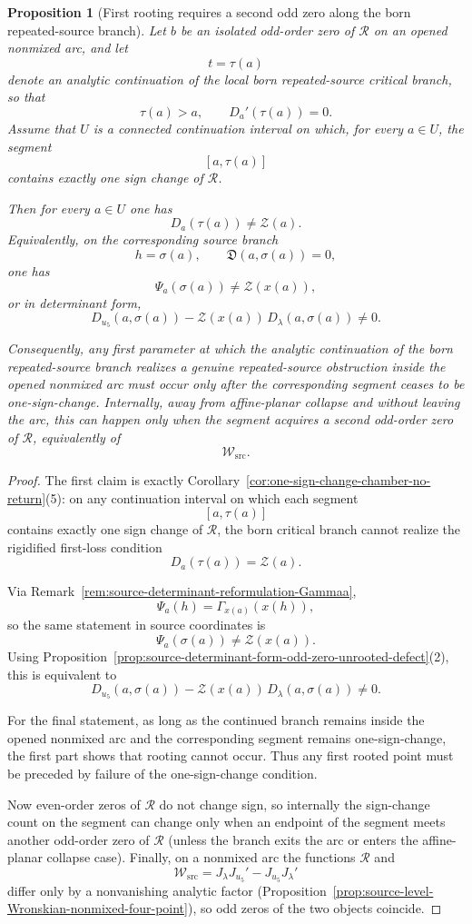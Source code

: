 \documentclass[11pt,a4paper]{amsart}
\theoremstyle{plain}
\newtheorem{proposition}[theorem]{Proposition}
\theoremstyle{definition}
\begin{document}
\begin{proposition}[First rooting requires a second odd zero along the born repeated-source branch]
\label{prop:first-rooting-requires-second-odd-zero-repeated-source}
Let $b$ be an isolated odd-order zero of $\mathcal R$ on an opened nonmixed
arc, and let
\[
t=\tau(a)
\]
denote an analytic continuation of the local born repeated-source critical
branch, so that
\[
\tau(a)>a,
\qquad
D_a'(\tau(a))=0.
\]
Assume that $U$ is a connected continuation interval on which, for every
$a\in U$, the segment
\[
[a,\tau(a)]
\]
contains exactly one sign change of $\mathcal R$.

Then for every $a\in U$ one has
\[
D_a(\tau(a))\neq \mathcal Z(a).
\]
Equivalently, on the corresponding source branch
\[
h=\sigma(a),
\qquad
\mathfrak D(a,\sigma(a))=0,
\]
one has
\[
\Psi_a(\sigma(a))\neq \mathcal Z(x(a)),
\]
or in determinant form,
\[
D_{u_5}(a,\sigma(a))-\mathcal Z(x(a))\,D_\lambda(a,\sigma(a))\neq 0.
\]

Consequently, any first parameter at which the analytic continuation of the
born repeated-source branch realizes a genuine repeated-source obstruction
inside the opened nonmixed arc must occur only after the corresponding segment
ceases to be one-sign-change. Internally, away from affine-planar collapse and
without leaving the arc, this can happen only when the segment acquires a
second odd-order zero of $\mathcal R$, equivalently of
\[
\mathcal W_{\mathrm{src}}.
\]
\end{proposition}

\begin{proof}
The first claim is exactly
Corollary~\ref{cor:one-sign-change-chamber-no-return}(5): on any continuation
interval on which each segment
\[
[a,\tau(a)]
\]
contains exactly one sign change of $\mathcal R$, the born critical branch
cannot realize the rigidified first-loss condition
\[
D_a(\tau(a))=\mathcal Z(a).
\]

Via Remark~\ref{rem:source-determinant-reformulation-Gammaa},
\[
\Psi_a(h)=\Gamma_{x(a)}(x(h)),
\]
so the same statement in source coordinates is
\[
\Psi_a(\sigma(a))\neq \mathcal Z(x(a)).
\]
Using
Proposition~\ref{prop:source-determinant-form-odd-zero-unrooted-defect}(2),
this is equivalent to
\[
D_{u_5}(a,\sigma(a))-\mathcal Z(x(a))\,D_\lambda(a,\sigma(a))\neq 0.
\]

For the final statement, as long as the continued branch remains inside the
opened nonmixed arc and the corresponding segment remains one-sign-change,
the first part shows that rooting cannot occur. Thus any first rooted point
must be preceded by failure of the one-sign-change condition.

Now even-order zeros of $\mathcal R$ do not change sign, so internally the
sign-change count on the segment can change only when an endpoint of the
segment meets another odd-order zero of $\mathcal R$ (unless the branch exits
the arc or enters the affine-planar collapse case). Finally, on a nonmixed arc
the functions $\mathcal R$ and
\[
\mathcal W_{\mathrm{src}}
=
J_\lambda J_{u_5}'-J_{u_5}J_\lambda'
\]
differ only by a nonvanishing analytic factor
(Proposition~\ref{prop:source-level-Wronskian-nonmixed-four-point}), so odd
zeros of the two objects coincide.
\end{proof}
\end{document}

